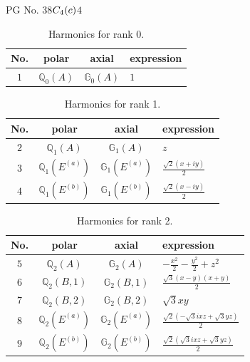 \documentclass[fleqn,8pt,landscape]{jsarticle}
\begin{document}
\setcounter{MaxMatrixCols}{32}

\renewcommand{\tablename}{Table~}
\renewcommand{\figurename}{Figure~}
\begin{center}
\LARGE
PG No. 38\quad$C_{\rm 4}(c)$\quad$4$\quad[ tetragonal ]
\end{center}
\begin{table}[ht!]
\begin{center}
\caption{Harmonics for rank 0.}
\renewcommand{\arraystretch}{1.3}
\begin{tabular}{cccl} \hline \hline
No. & polar & axial & expression \\ \hline
$ 1 $ & $ \mathbb{Q}_{0}(A) $ & $ \mathbb{G}_{0}(A) $ & $ 1 $ \\
 \hline \hline
\end{tabular}
\end{center}
\end{table}
\begin{table}[ht!]
\begin{center}
\caption{Harmonics for rank 1.}
\renewcommand{\arraystretch}{1.3}
\begin{tabular}{cccl} \hline \hline
No. & polar & axial & expression \\ \hline
$ 2 $ & $ \mathbb{Q}_{1}(A) $ & $ \mathbb{G}_{1}(A) $ & $ z $ \\
$ 3 $ & $ \mathbb{Q}_{1}(E^{(a)}) $ & $ \mathbb{G}_{1}(E^{(a)}) $ & $ \frac{\sqrt{2} \left(x + i y\right)}{2} $ \\
$ 4 $ & $ \mathbb{Q}_{1}(E^{(b)}) $ & $ \mathbb{G}_{1}(E^{(b)}) $ & $ \frac{\sqrt{2} \left(x - i y\right)}{2} $ \\
 \hline \hline
\end{tabular}
\end{center}
\end{table}
\begin{table}[ht!]
\begin{center}
\caption{Harmonics for rank 2.}
\renewcommand{\arraystretch}{1.3}
\begin{tabular}{cccl} \hline \hline
No. & polar & axial & expression \\ \hline
$ 5 $ & $ \mathbb{Q}_{2}(A) $ & $ \mathbb{G}_{2}(A) $ & $ - \frac{x^{2}}{2} - \frac{y^{2}}{2} + z^{2} $ \\
$ 6 $ & $ \mathbb{Q}_{2}(B,1) $ & $ \mathbb{G}_{2}(B,1) $ & $ \frac{\sqrt{3} \left(x - y\right) \left(x + y\right)}{2} $ \\
$ 7 $ & $ \mathbb{Q}_{2}(B,2) $ & $ \mathbb{G}_{2}(B,2) $ & $ \sqrt{3} x y $ \\
$ 8 $ & $ \mathbb{Q}_{2}(E^{(a)}) $ & $ \mathbb{G}_{2}(E^{(a)}) $ & $ \frac{\sqrt{2} \left(- \sqrt{3} i x z + \sqrt{3} y z\right)}{2} $ \\
$ 9 $ & $ \mathbb{Q}_{2}(E^{(b)}) $ & $ \mathbb{G}_{2}(E^{(b)}) $ & $ \frac{\sqrt{2} \left(\sqrt{3} i x z + \sqrt{3} y z\right)}{2} $ \\
 \hline \hline
\end{tabular}
\end{center}
\end{table}
\end{document}
